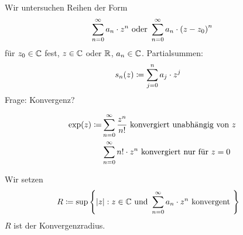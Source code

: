 \thispagestyle{pagenumberonly}

Wir untersuchen Reihen der Form
\begin{align*}
    \sum_{n=0}^{\infty} a_n\cdot z^n \text{ oder } \sum_{n=0}^{\infty} a_n \cdot \left(z-z_0\right)^n
\end{align*}
für $z_0\in\mathbb{C}$ fest, $z\in\mathbb{C}$ oder $\mathbb{R}$, $a_n\in\mathbb{C}$. Partialsummen:
\begin{align*}
    s_n(z) &\coloneqq \sum_{j=0}^{n} a_j\cdot z^j
\end{align*}
Frage: Konvergenz?
\begin{beispiel}
    \begin{align*}
        \exp(z) \coloneqq &\sum_{n=0}^{\infty} \frac{z^n}{n!} \text{ konvergiert unabhängig von } z \\
        &\sum_{n=0}^{\infty} n! \cdot z^n \text{ konvergiert nur für } z=0
    \end{align*}
\end{beispiel}

\begin{definition}[Konvergenzradius]
    Wir setzen
    \begin{align*}
        R &\coloneqq \sup \left\{\left\lvert z\right\rvert: z\in\mathbb{C} \text{ und } \sum_{n=0}^{\infty} a_n \cdot z^n \text{ konvergent } \right\}
    \end{align*}
    $R$ ist der Konvergenzradius.
\end{definition}

